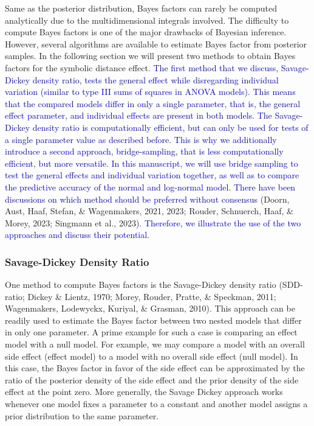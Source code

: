 \documentclass[
  english,
  doc,floatsintext]{apa6}
\begin{document}
Same as the posterior distribution, Bayes factors can rarely be computed analytically due to the multidimensional integrals involved. The difficulty to compute Bayes factors is one of the major drawbacks of Bayesian inference. However, several algorithms are available to estimate Bayes factor from posterior samples. In the following section we will present two methods to obtain Bayes factors for the symbolic distance effect. \textcolor{blue}{The first method that we discuss, Savage-Dickey density ratio, tests the general effect while disregarding individual variation (similar to type III sums of squares in ANOVA models). This means that the compared models differ in only a single parameter, that is, the general effect parameter, and individual effects are present in both models. The Savage-Dickey density ratio is computationally efficient, but can only be used for tests of a single parameter value as described before. This is why we additionally introduce a second approach, bridge-sampling, that is less computationally efficient, but more versatile. In this manuscript, we will use bridge sampling to test the general effects and individual variation together, as well as to compare the predictive accuracy of the normal and log-normal model. There have been discussions on which method should be preferred without consensus} (Doorn, Aust, Haaf, Stefan, \& Wagenmakers, 2021, 2023; Rouder, Schnuerch, Haaf, \& Morey, 2023; Singmann et al., 2023). \textcolor{blue}{Therefore, we illustrate the use of the two approaches and discuss their potential.}

\hypertarget{savage-dickey-density-ratio}{%
\subsubsection{Savage-Dickey Density Ratio}\label{savage-dickey-density-ratio}}

One method to compute Bayes factors is the Savage-Dickey density ratio (SDD-ratio; Dickey \& Lientz, 1970; Morey, Rouder, Pratte, \& Speckman, 2011; Wagenmakers, Lodewyckx, Kuriyal, \& Grasman, 2010). This approach can be readily used to estimate the Bayes factor between two nested models that differ in only one parameter. A prime example for such a case is comparing an effect model with a null model. For example, we may compare a model with an overall side effect (effect model) to a model with no overall side effect (null model). In this case, the Bayes factor in favor of the side effect can be approximated by the ratio of the posterior density of the side effect and the prior density of the side effect at the point zero. More generally, the Savage Dickey approach works whenever one model fixes a parameter to a constant and another model assigns a prior distribution to the same parameter.
\end{document}
